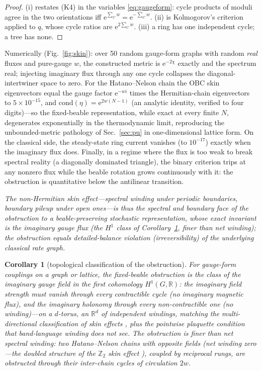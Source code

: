 \documentclass[11pt]{article}
\newtheorem{corollary}[theorem]{Corollary}
\theoremstyle{definition}
\theoremstyle{remark}
\newcommand{\ee}{\mathrm{e}}
\begin{document}
\begin{proof}
(i) restates (K4) in the variables \eqref{eq:gaugeform}: cycle products of
moduli agree in the two orientations iff $\ee^{\sum_C w}=\ee^{-\sum_C w}$.
(ii) is Kolmogorov's criterion applied to $q$, whose cycle ratios are
$\ee^{2\sum_C w}$. (iii) a ring has one independent cycle; a tree has
none.
\end{proof}

Numerically (Fig.~\ref{fig:skin}): over 50 random gauge-form graphs with
random \emph{real} fluxes and pure-gauge $w$, the constructed metric is
$\ee^{-2\chi}$ exactly and the spectrum real; injecting imaginary flux
through any one cycle collapses the diagonal-intertwiner space to zero.
For the Hatano--Nelson chain the OBC skin eigenvectors equal the gauge
factor $\ee^{-wi}$ times the Hermitian-chain eigenvectors to $5\times
10^{-15}$, and $\mathrm{cond}(\eta)=\ee^{2w(N-1)}$ (an analytic identity,
verified to four digits)---so the
fixed-beable representation, while exact at every finite $N$, degenerates
exponentially in the thermodynamic limit, reproducing the unbounded-metric
pathology of Sec.~\ref{sec:pu} in one-dimensional lattice form. On the
classical side, the steady-state ring current vanishes (to $10^{-17}$)
exactly when the imaginary flux does. Finally, in a regime where the flux
is too weak to break spectral reality (a diagonally dominated triangle),
the binary criterion trips at any nonzero flux while the beable rotation
grows continuously with it: the obstruction is quantitative below the
antilinear transition.

\emph{The non-Hermitian skin effect---spectral winding under periodic
boundaries, boundary pileup under open ones---is thus the spectral and
boundary face of the obstruction to a beable-preserving stochastic
representation, whose exact invariant is the imaginary gauge flux (the
$H^{1}$ class of Corollary~\ref{cor:topology}, finer than net winding);
the obstruction equals detailed-balance violation (irreversibility) of
the underlying classical rate graph.}

\begin{corollary}[topological classification of the obstruction]
\label{cor:topology}
For gauge-form couplings on a graph or lattice, the fixed-beable
obstruction is the class of the imaginary gauge field in the first
cohomology $H^{1}(G,\mathbb R)$: the imaginary \emph{field strength} must
vanish through every contractible cycle (no imaginary magnetic flux), and
the imaginary \emph{holonomy} through every non-contractible one (no
winding)---on a $d$-torus, an $\mathbb R^{d}$ of independent windings,
matching the multi-directional classification of skin effects
\cite{Okuma2020}, plus the pointwise plaquette condition that
band-language winding does not see. The obstruction is finer than net
spectral winding: two Hatano--Nelson chains with \emph{opposite} fields
(net winding zero---the doubled structure of the $\mathbb Z_2$ skin
effect \cite{Okuma2020}), coupled by reciprocal rungs, are obstructed
through their inter-chain cycles of circulation $2w$.
\end{corollary}
\end{document}
